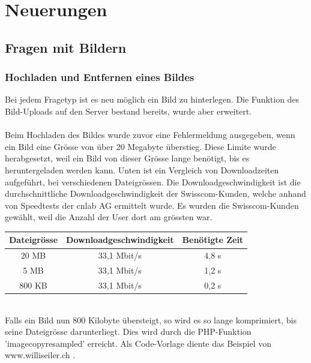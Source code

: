 
\section{Neuerungen}

\subsection{Fragen mit Bildern}

\subsubsection{Hochladen und Entfernen eines Bildes}
Bei jedem Fragetyp ist es neu möglich ein Bild zu hinterlegen. Die Funktion des Bild-Uploads auf den Server bestand bereits, wurde aber erweitert.
\\
\\
Beim Hochladen des Bildes wurde zuvor eine Fehlermeldung ausgegeben, wenn ein Bild eine Grösse von über 20 Megabyte überstieg. Diese Limite wurde herabgesetzt, weil ein Bild von dieser Grösse lange benötigt, bis es heruntergeladen werden kann. Unten ist ein Vergleich von Downloadzeiten aufgeführt, bei verschiedenen Dateigrössen. Die Downloadgeschwindigkeit ist die durchschnittliche Downloadgeschwindigkeit der Swisscom-Kunden, welche anhand von Speedtests der cnlab AG \cite{cnlab_speedtest} ermittelt wurde. Es wurden die Swisscom-Kunden gewählt, weil die Anzahl der User dort am grössten war. \\


\begin{tabular}{|c|c|c|}
	\hline 
	Dateigrösse & Downloadgeschwindigkeit & Benötigte Zeit \\ 
	\hline 
	20 MB & 33,1 Mbit/s & 4,8 s \\ 
	\hline 
	5 MB & 33,1 Mbit/s & 1,2 s \\ 
	\hline 
	800 KB & 33,1 Mbit/s & 0,2 s \\ 
	\hline 
\end{tabular}\\

Falls ein Bild nun 800 Kilobyte übersteigt, so wird es so lange komprimiert, bis seine Dateigrösse darunterliegt. Dies wird durch die PHP-Funktion 'imagecopyresampled' erreicht. Als Code-Vorlage diente das Beispiel von www.williseiler.ch \cite{willis_php}. \\

